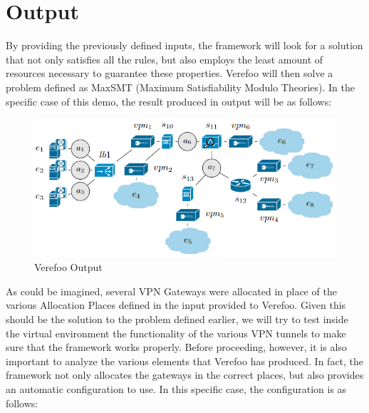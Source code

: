 \section{Output}
By providing the previously defined inputs, the framework will look for a solution that not only satisfies all the rules, but also employs the least amount of resources necessary to guarantee these properties. Verefoo will then solve a problem defined as MaxSMT (Maximum Satisfiability Modulo Theories). 
In the specific case of this demo, the result produced in output will be as follows:

\begin{figure}[h]  %
    \centering
    \includegraphics[width=1\textwidth]{VPN_deploy.PNG} 
    \caption{Verefoo Output}
    \label{fig:VPNDeploy}
\end{figure}

As could be imagined, several VPN Gateways were allocated in place of the various Allocation Places defined in the input provided to Verefoo. Given this should be the solution to the problem defined earlier, we will try to test inside the virtual environment the functionality of the various VPN tunnels to make sure that the framework works properly.
Before proceeding, however, it is also important to analyze the various elements that Verefoo has produced. In fact, the framework not only allocates the gateways in the correct places, but also provides an automatic configuration to use. In this specific case, the configuration is as follows:
\\

